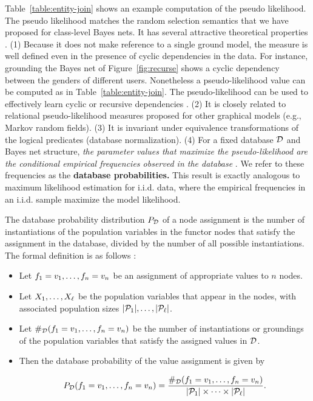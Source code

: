 \documentclass[oribibl]{llncs}
\begin{document}
\noindent Table~\ref{table:entity-join} shows an example computation of the pseudo likelihood.
%
The pseudo likelihood matches the random selection semantics that we have proposed for class-level Bayes nets. It has several attractive theoretical properties \cite{Schulte2011}. (1) Because it does not make reference to a single ground model, the measure is well defined even in the presence of cyclic dependencies in the data. For instance, grounding the Bayes net of Figure~\ref{fig:recurse} shows a cyclic dependency between the genders of different users. Nonetheless a pseudo-likelihood value can be computed as in Table~\ref{table:entity-join}. The pseudo-likelihood can be used to effectively learn cyclic or recursive dependencies \cite{Schulte2012}. (2) It is closely related to relational pseudo-likelihood measures proposed for other graphical models (e.g., Markov random fields). (3) It is invariant under equivalence transformations of the logical predicates (database normalization). (4) For a fixed database $\mathcal{D}$ and Bayes net structure, {\em the parameter values that maximize the pseudo-likelihood are the conditional empirical frequencies observed in the database} \cite[Prop.3.1]{Schulte2011}. We refer to these frequencies as the \textbf{database probabilities.} This result is exactly analogous to  maximum likelihood estimation for i.i.d. data, where the empirical frequencies in an i.i.d. sample maximize the  model likelihood.

The database probability distribution $P_{\mathcal{D}}$ of a node assignment is the number of instantiations of the population variables in the functor nodes that satisfy the assignment in the database, divided by the number of all possible instantiations. The formal definition is as follows \cite{Chiang2012}:

\begin{itemize}
\item Let $f_{1} = v_{1}, \ldots, f_{n} = v_{n}$ be an assignment of appropriate values to $n$ nodes. 
\item Let $X_{1},\ldots,X_{\ell}$ be the population variables that appear in the nodes, with associated population sizes $|\mathcal{P}_{1}|, \ldots, |\mathcal{P}_{\ell}|$.
\item Let $\#_{\mathcal{D}}(f_{1} = v_{1}, \ldots, f_{n} = v_{n})$ be the number of instantiations or groundings of the population variables that satisfy the assigned values in $\mathcal{D}$.
\item Then the database probability of the value assignment is given by

$$P_{\mathcal{D}}(f_{1} = v_{1}, \ldots, f_{n} = v_{n}) = \frac{\#_{\mathcal{D}}(f_{1} = v_{1}, \ldots, f_{n} = v_{n})}{|\mathcal{P}_{1}| \times \cdots \times |\mathcal{P}_{\ell}|}.$$
\end{itemize}
\end{document}
